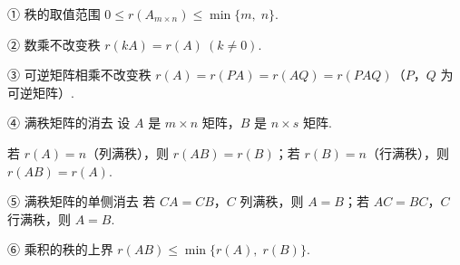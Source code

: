 %




\begin{fcard}{① 秩的取值范围}
$0\le r(A_{m\times n})\le\min\{m,\;n\}$.
\end{fcard}

\begin{fcard}{② 数乘不改变秩}
$r(kA)=r(A)\ (k\ne 0)$.
\end{fcard}

\begin{fcard}{③ 可逆矩阵相乘不改变秩}
$r(A)=r(PA)=r(AQ)=r(PAQ)$（$P$，$Q$ 为可逆矩阵）.
\end{fcard}

\begin{fcard}{④ 满秩矩阵的消去}
设 $A$ 是 $m\times n$ 矩阵，$B$ 是 $n\times s$ 矩阵.

若 $r(A)=n$（列满秩），则 $r(AB)=r(B)$；若 $r(B)=n$（行满秩），则 $r(AB)=r(A)$.
\end{fcard}

\begin{fkey}{⑤ 满秩矩阵的单侧消去}
若 $CA=CB$，$C$ 列满秩，则 $A=B$；若 $AC=BC$，$C$ 行满秩，则 $A=B$.
\end{fkey}

\begin{fcard}{⑥ 乘积的秩的上界}
$r(AB)\le\min\{r(A),\;r(B)\}$.
\end{fcard}

